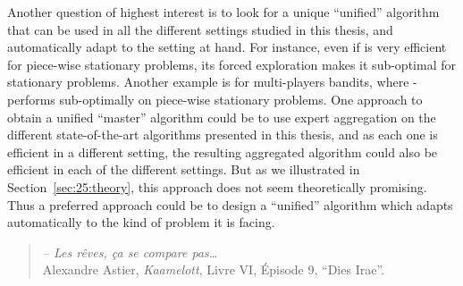 Another question of highest interest is to look for a unique ``unified'' algorithm that can be used in all the different settings studied in this thesis, and automatically adapt to the setting at hand.
For instance, even if \GLRklUCB{} is very efficient for piece-wise stationary problems, its forced exploration makes it sub-optimal for stationary problems.
Another example is for multi-players bandits, where \MCTopM-\klUCB{} performs sub-optimally on piece-wise stationary problems.
One approach to obtain a unified ``master'' algorithm could be to use expert aggregation on the different state-of-the-art algorithms presented in this thesis, and as each one is efficient in a different setting, the resulting aggregated algorithm could also be efficient in each of the different settings.
But as we illustrated in Section~\ref{sec:25:theory}, this approach does not seem theoretically promising.
Thus a preferred approach could be to design a ``unified'' algorithm which adapts automatically to the kind of problem it is facing.






\hr{}

\vfill{}


\begin{small}
\begin{quote}
    \emph{-- Les rêves, ça se compare pas\ldots}\\
    Alexandre Astier, \emph{Kaamelott}, Livre VI, Épisode 9, ``Dies Irae''.
\end{quote}
\end{small}
